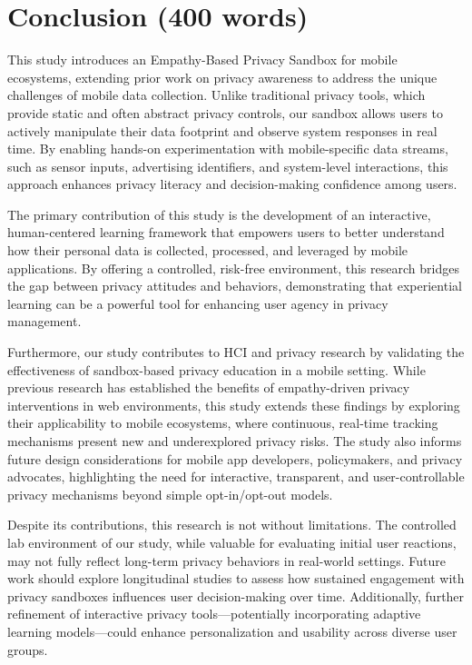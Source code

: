 \documentclass[acmlarge, nonacm]{acmart}
\begin{document}
\section{Conclusion (400 words)}

This study introduces an Empathy-Based Privacy Sandbox for mobile ecosystems, extending prior work on privacy awareness to address the unique challenges of mobile data collection. Unlike traditional privacy tools, which provide static and often abstract privacy controls, our sandbox allows users to actively manipulate their data footprint and observe system responses in real time. By enabling hands-on experimentation with mobile-specific data streams, such as sensor inputs, advertising identifiers, and system-level interactions, this approach enhances privacy literacy and decision-making confidence among users.

The primary contribution of this study is the development of an interactive, human-centered learning framework that empowers users to better understand how their personal data is collected, processed, and leveraged by mobile applications. By offering a controlled, risk-free environment, this research bridges the gap between privacy attitudes and behaviors, demonstrating that experiential learning can be a powerful tool for enhancing user agency in privacy management.

Furthermore, our study contributes to HCI and privacy research by validating the effectiveness of sandbox-based privacy education in a mobile setting. While previous research has established the benefits of empathy-driven privacy interventions in web environments, this study extends these findings by exploring their applicability to mobile ecosystems, where continuous, real-time tracking mechanisms present new and underexplored privacy risks. The study also informs future design considerations for mobile app developers, policymakers, and privacy advocates, highlighting the need for interactive, transparent, and user-controllable privacy mechanisms beyond simple opt-in/opt-out models.

Despite its contributions, this research is not without limitations. The controlled lab environment of our study, while valuable for evaluating initial user reactions, may not fully reflect long-term privacy behaviors in real-world settings. Future work should explore longitudinal studies to assess how sustained engagement with privacy sandboxes influences user decision-making over time. Additionally, further refinement of interactive privacy tools—potentially incorporating adaptive learning models—could enhance personalization and usability across diverse user groups.
\end{document}

